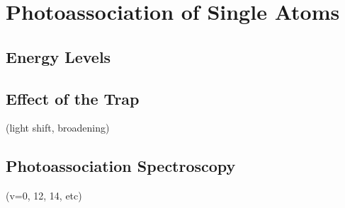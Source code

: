 
\chapter{Photoassociation of Single Atoms}
\label{ch:pa}

\section{Energy Levels}


\section{Effect of the Trap}

(light shift, broadening)

\section{Photoassociation Spectroscopy}
(v=0, 12, 14, etc)
